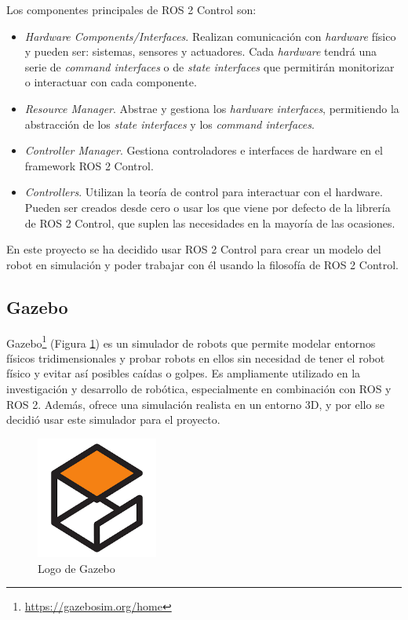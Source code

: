 Los componentes principales de ROS 2 Control son:

\begin{itemize}
	\item \textit{Hardware Components/Interfaces}. Realizan comunicación con \textit{hardware} físico y pueden ser: sistemas, sensores y actuadores. Cada \textit{hardware} tendrá una serie de \textit{command interfaces} o de \textit{state interfaces} que permitirán monitorizar o interactuar con cada componente.
	\item \textit{Resource Manager}. Abstrae y gestiona los \textit{hardware interfaces}, permitiendo la abstracción de los \textit{state interfaces} y los \textit{command interfaces}.
	\item\textit{Controller Manager}. Gestiona controladores e interfaces de hardware en el framework ROS 2 Control.
	\item \textit{Controllers}. Utilizan la teoría de control para interactuar con el hardware. Pueden ser creados desde cero o usar los que viene por defecto de la librería de ROS 2 Control, que suplen las necesidades en la mayoría de las ocasiones.
\end{itemize}

En este proyecto se ha decidido usar ROS 2 Control para crear un modelo del robot en simulación y poder trabajar con él usando la filosofía de ROS 2 Control.


\subsection{Gazebo}

Gazebo\footnote{\url{https://gazebosim.org/home}} (Figura \ref{fig:gazebo}) es un simulador de robots que permite modelar entornos físicos tridimensionales y probar robots en ellos sin necesidad de tener el robot físico y evitar así posibles caídas o golpes. Es ampliamente utilizado en la investigación y desarrollo de robótica, especialmente en combinación con ROS y ROS 2. Además, ofrece una simulación realista en un entorno 3D, y por ello se decidió usar este simulador para el proyecto.

\begin{figure} [h!]
	\begin{center}
		\includegraphics[width=4cm]{figs/gazebo.png}
	\end{center}
	\caption{Logo de Gazebo} %
	\label{fig:gazebo}
\end{figure}

